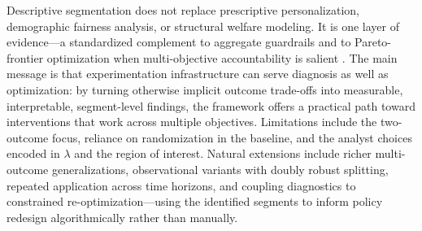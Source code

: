 \documentclass[12pt,a4paper]{article}
\begin{document}
Descriptive segmentation does not replace prescriptive personalization, demographic fairness analysis, or structural welfare modeling. It is one layer of evidence---a standardized complement to aggregate guardrails and to Pareto-frontier optimization when multi-objective accountability is salient \citep{rafieian2025multiobjective}. The main message is that experimentation infrastructure can serve diagnosis as well as optimization: by turning otherwise implicit outcome trade-offs into measurable, interpretable, segment-level findings, the framework offers a practical path toward interventions that work across multiple objectives. Limitations include the two-outcome focus, reliance on randomization in the baseline, and the analyst choices encoded in $\lambda$ and the region of interest. Natural extensions include richer multi-outcome generalizations, observational variants with doubly robust splitting, repeated application across time horizons, and coupling diagnostics to constrained re-optimization---using the identified segments to inform policy redesign algorithmically rather than manually.



\end{document}
